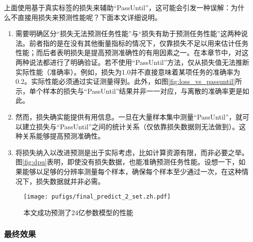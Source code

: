 上面使用基于真实标签的损失来辅助“PassUntil”，这可能会引发一种误解：为什么不直接用损失来预测性能呢？下面本文详细说明。
\begin{enumerate}
    \item {需要明确区分“损失无法预测任务性能”与“损失有助于预测任务性能”这两种说法。前者指的是在没有其他衡量指标的情况下，仅靠损失不足以用来估计任务性能；而后者表明损失是提高预测准确性的有用因素之一。在本章节中，对这两种说法都进行了明确验证。若不使用“PassUntil”方法，仅从损失值无法推断实际性能（准确率）。例如，损失为1.0并不直接意味着某项任务的准确率为0.2。实际性能必须通过实证测量得到。此外，如图\ref{fig:loss_vs_passuntil}所示，单个样本的损失与“PassUntil”结果并非一一对应，与离散的准确率更是如此。}
    \item {然而，损失确实能提供有用信息。一旦在大量样本集中测量“PassUntil”，就可以建立损失与“PassUntil”之间的统计关系（仅依靠损失数据则无法做到）。这种关系能够提高预测准确性。}
    \item {将损失纳入以改进预测是出于实际考虑，比如计算资源有限，而非必要之举。图\ref{fig:dpu}表明，即使没有损失数据，也能准确预测任务性能。设想一下，如果能够以足够的分辨率测量每个样本，确保每个样本至少通过一次，在这种情况下，损失数据就并非必需。}
\end{enumerate}


\begin{figure}[!htbp]
    \centering
    \texttt{[image: pufigs/final\_predict\_2\_set.zh.pdf]}
    \caption{本文成功预测了24亿参数模型的性能}
    \label{fig:final_curve_humaneval_series1} 
\end{figure}


\subsubsection{最终效果}
\begin{table}[!htbp]
    \centering
    \caption{本文任务性能可预测方法的最终效果}
    \label{tab:final_fit_result}
\end{table}



